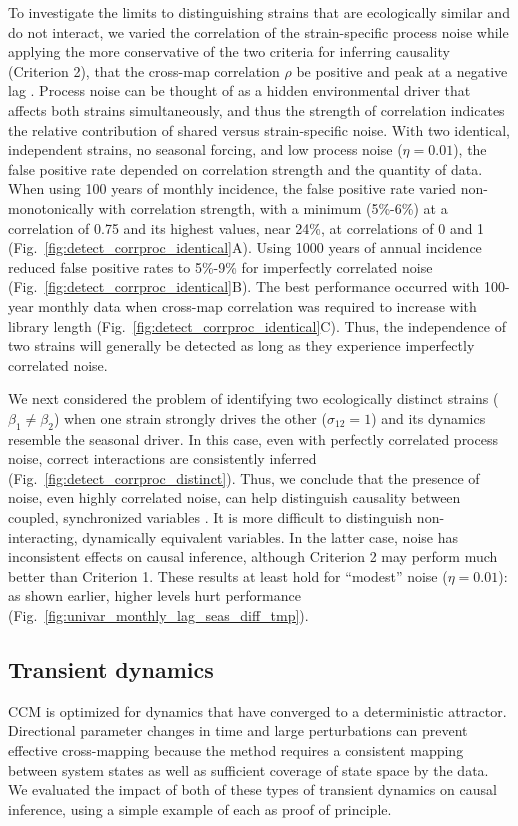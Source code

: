 To investigate the limits to distinguishing strains that are ecologically similar and do not interact, we varied the correlation of the strain-specific process noise while applying the more conservative of the two criteria for inferring causality (Criterion 2), that the cross-map correlation $\rho$ be positive and peak at a negative lag \cite{Ye2015}.
Process noise can be thought of as a hidden environmental driver that affects both strains simultaneously, and thus the strength of correlation indicates the relative contribution of shared versus strain-specific noise.  
With two identical, independent strains, no seasonal forcing, and low process noise ($\eta=0.01$), the false positive rate depended on correlation strength and the quantity of data.
When using 100 years of monthly incidence, the false positive rate varied non-monotonically with correlation strength, with a minimum (5\%-6\%) at a correlation of 0.75 and its highest values, near 24\%, at correlations of 0 and 1 (Fig.~\ref{fig:detect_corrproc_identical}A).
Using 1000 years of annual incidence reduced false positive rates to 5\%-9\% for imperfectly correlated noise (Fig.~\ref{fig:detect_corrproc_identical}B).
The best performance occurred with 100-year monthly data when cross-map correlation was required to increase with library length (Fig.~\ref{fig:detect_corrproc_identical}C).
Thus, the independence of two strains will generally be detected as long as they experience imperfectly correlated noise. 

We next considered the problem of identifying two ecologically distinct strains ($\beta_1 \neq \beta_2$) when one strain strongly drives the other ($\sigma_{12}=1$) and its dynamics resemble the seasonal driver.
In this case, even with perfectly correlated process noise, correct interactions are consistently inferred (Fig.~\ref{fig:detect_corrproc_distinct}).
Thus, we conclude that the presence of noise, even highly correlated noise, can help distinguish causality between coupled, synchronized variables \cite{Schumacher2015}.
It is more difficult to distinguish non-interacting, dynamically equivalent variables.
In the latter case, noise has inconsistent effects on causal inference, although Criterion 2 may perform much better than Criterion 1.
These results at least hold for ``modest'' noise ($\eta=0.01$): as shown earlier, higher levels hurt performance (Fig.~\ref{fig:univar_monthly_lag_seas_diff_tmp}).


\subsection*{Transient dynamics}
CCM is optimized for dynamics that have converged to a deterministic attractor.
Directional parameter changes in time and large perturbations can prevent effective cross-mapping because the method requires a consistent mapping between system states as well as sufficient coverage of state space by the data.
We evaluated the impact of both of these types of transient dynamics on causal inference, using a simple example of each as proof of principle.

